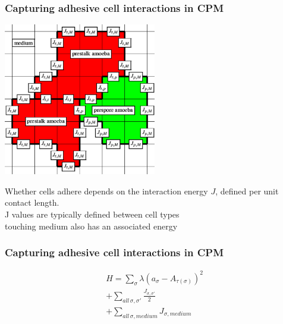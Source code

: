 \documentclass[compress]{beamer}
\begin{document}
 \begin{frame}
\frametitle{Capturing adhesive cell interactions in CPM}   
\begin{center}
  \includegraphics[width=0.5\textwidth]{figures/explanation.pdf}
\end{center}
Whether cells adhere depends on the interaction energy $J$, defined per unit contact length.\\
J values are typically defined between cell types\\
touching medium also has an associated energy
 
\end{frame}

 \begin{frame}
\frametitle{Capturing adhesive cell interactions in CPM}   

\begin{multline}
 H = \sum_\sigma \lambda ( a_\sigma - A_{\tau(\sigma)}  )^2\\
+ \sum_{all\,\sigma,\sigma'} \frac{J_{\sigma,\sigma'}}{2}\\
+\sum_{all\,\sigma,medium} J_{\sigma,medium}
\end{multline}
\end{frame}
\end{document}
